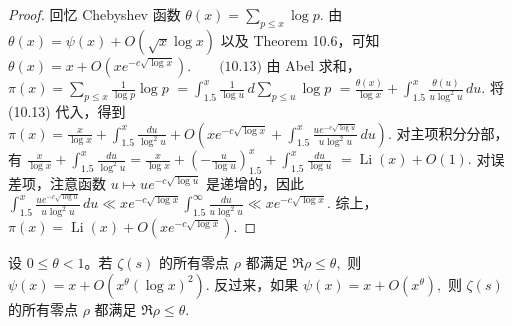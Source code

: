 \begin{proof}
	回忆 Chebyshev 函数
	\(\textstyle \theta(x)=\allowbreak{}\sum_{p\leq\allowbreak{} x}\log p.\)
	由
	\(\textstyle \theta(x)=\allowbreak{}\psi(x)+\allowbreak{}O(\sqrt{x}\log x)\)
	以及 Theorem 10.6，可知
	\(\textstyle \theta(x) =\allowbreak{} x+\allowbreak{}O\left(xe^{-c\sqrt{\log x}}\right). \qquad\text{(10.13)}\)
	由 Abel 求和，
	\(\textstyle \pi(x) =\allowbreak{} \sum_{p\leq\allowbreak{} x}\frac1{\log p}\log p\) \(\textstyle =\allowbreak{} \int_{1.5}^{x}\frac1{\log u}\,d\sum_{p\leq\allowbreak{} u}\log p\) \(\textstyle =\allowbreak{} \frac{\theta(x)}{\log x} +\allowbreak{} \int_{1.5}^{x}\frac{\theta(u)}{u\log^2u}\,du.\)
	将 (10.13) 代入，得到
	\(\textstyle \pi(x) =\allowbreak{} \frac{x}{\log x} +\allowbreak{} \int_{1.5}^{x}\frac{du}{\log^2u} +\allowbreak{} O\left( xe^{-c\sqrt{\log x}} +\allowbreak{} \int_{1.5}^{x}\frac{u e^{-c\sqrt{\log u}}}{u\log^2u}\,du \right).\)
	对主项积分分部，有
	\(\textstyle \frac{x}{\log x} +\allowbreak{} \int_{1.5}^{x}\frac{du}{\log^2u} =\allowbreak{} \frac{x}{\log x} +\allowbreak{} \left(-\frac{u}{\log u}\right)_{1.5}^{x} +\allowbreak{} \int_{1.5}^{x}\frac{du}{\log u}\) \(\textstyle =\allowbreak{} \operatorname{Li}(x)+\allowbreak{}O(1).\)
	对误差项，注意函数
	\(\textstyle u\longmapsto u e^{-c\sqrt{\log u}}\)
	是递增的，因此
	\(\textstyle \int_{1.5}^{x} \frac{u e^{-c\sqrt{\log u}}}{u\log^2u}\,du \ll\allowbreak{} xe^{-c\sqrt{\log x}} \int_{1.5}^{\infty}\frac{du}{u\log^2u} \ll\allowbreak{} xe^{-c\sqrt{\log x}}.\)
	综上，
	\(\textstyle \pi(x) =\allowbreak{} \operatorname{Li}(x) +\allowbreak{} O\left(xe^{-c\sqrt{\log x}}\right).\)
\end{proof}


\begin{theorem}[原文 Theorem 10.8]
	设 $0\leq\theta<1$。若 $\zeta(s)$ 的所有零点 $\rho$ 都满足
	\(\textstyle \Re\rho\leq\allowbreak{}\theta,\allowbreak{}\)
	则
	\(\textstyle \psi(x) =\allowbreak{} x+\allowbreak{}O\left(x^\theta(\log x)^2\right).\)
	反过来，如果
	\(\textstyle \psi(x)=\allowbreak{}x+\allowbreak{}O(x^\theta),\allowbreak{}\)
	则 $\zeta(s)$ 的所有零点 $\rho$ 都满足
	\(\textstyle \Re\rho\leq\allowbreak{}\theta.\)
\end{theorem}


